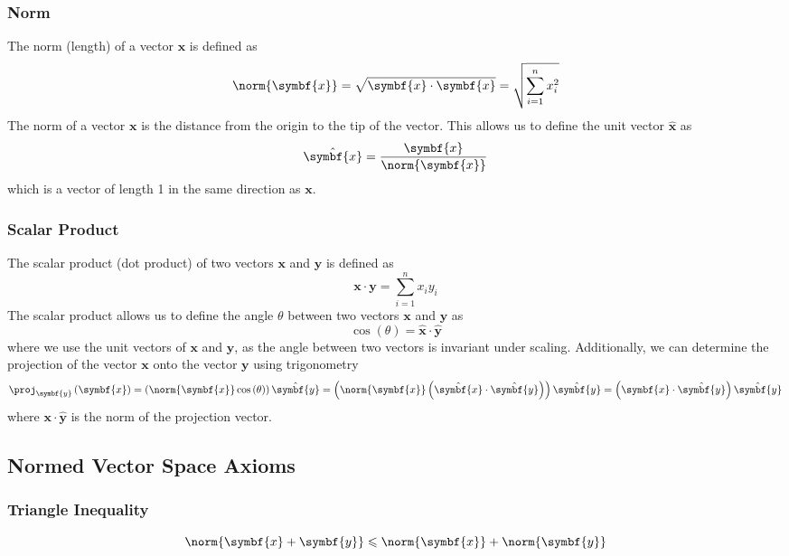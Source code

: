 \documentclass{article}
\begin{document}
\subsubsection{Norm}
The norm (length) of a vector \(\symbf{x}\) is defined as
\begin{equation*}
    \norm{\symbf{x}} = \sqrt{\symbf{x} \cdot \symbf{x}} = \sqrt{\sum_{i=1}^n x_i^2}
\end{equation*}
The norm of a vector \(\symbf{x}\) is the distance from the origin to the tip of the vector.
This allows us to define the unit vector \(\hat{\symbf{x}}\) as
\begin{equation*}
    \hat{\symbf{x}} = \frac{\symbf{x}}{\norm{\symbf{x}}}
\end{equation*}
which is a vector of length 1 in the same direction as \(\symbf{x}\).
\subsubsection{Scalar Product}
The scalar product (dot product) of two vectors \(\symbf{x}\) and
\(\symbf{y}\) is defined as
\begin{equation*}
    \symbf{x} \cdot \symbf{y} = \sum_{i=1}^n x_i y_i
\end{equation*}
The scalar product allows us to define the angle \(\theta\) between two vectors \(\symbf{x}\) and \(\symbf{y}\) as
\begin{equation*}
    \cos{\left( \theta \right)} = \hat{\symbf{x}} \cdot \hat{\symbf{y}}
\end{equation*}
where we use the unit vectors of \(\symbf{x}\) and \(\symbf{y}\), as the angle between two vectors is invariant under scaling.
Additionally, we can determine the projection of the vector \(\symbf{x}\) onto the vector \(\symbf{y}\) using trigonometry
\begin{equation*}
    \proj_{\symbf{y}} \left( \symbf{x} \right) = \left( \norm{\symbf{x}} \cos{\left( \theta \right)} \right) \hat{\symbf{y}} = \left( \norm{\symbf{x}} \left( \hat{\symbf{x}} \cdot \hat{\symbf{y}} \right) \right) \hat{\symbf{y}} = \left( \symbf{x} \cdot \hat{\symbf{y}} \right) \hat{\symbf{y}}
\end{equation*}
where \(\symbf{x} \cdot \hat{\symbf{y}}\) is the norm of the projection vector.
\subsection{Normed Vector Space Axioms}
\subsubsection{Triangle Inequality}
\begin{equation*}
    \norm{\symbf{x} + \symbf{y}} \leqslant \norm{\symbf{x}} + \norm{\symbf{y}}
\end{equation*}
\end{document}
